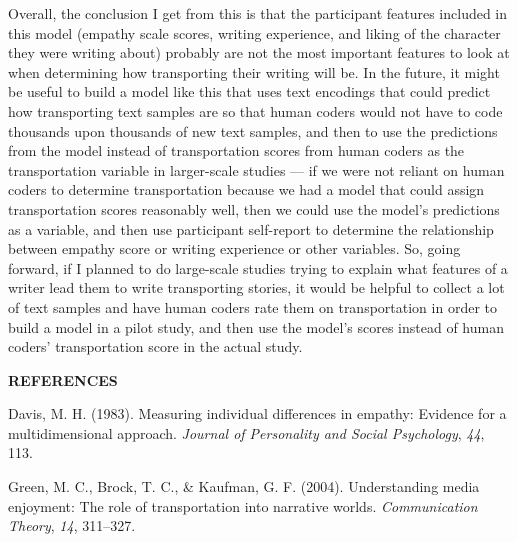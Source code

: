 \documentclass[
  man,floatsintext]{apa6}
\newlength{\cslhangindent}
\newlength{\cslentryspacingunit} %
\newenvironment{CSLReferences}[2] %
 {%
  \setlength{\parindent}{0pt}
  \ifodd #1
  \let\oldpar\par
  \def\par{\hangindent=\cslhangindent\oldpar}
  \fi
  \setlength{\parskip}{#2\cslentryspacingunit}
 }%
 {}
\begin{document}
Overall, the conclusion I get from this is that the participant features included in this model (empathy scale scores, writing experience, and liking of the character they were writing about) probably are not the most important features to look at when determining how transporting their writing will be. In the future, it might be useful to build a model like this that uses text encodings that could predict how transporting text samples are so that human coders would not have to code thousands upon thousands of new text samples, and then to use the predictions from the model instead of transportation scores from human coders as the transportation variable in larger-scale studies --- if we were not reliant on human coders to determine transportation because we had a model that could assign transportation scores reasonably well, then we could use the model's predictions as a variable, and then use participant self-report to determine the relationship between empathy score or writing experience or other variables. So, going forward, if I planned to do large-scale studies trying to explain what features of a writer lead them to write transporting stories, it would be helpful to collect a lot of text samples and have human coders rate them on transportation in order to build a model in a pilot study, and then use the model's scores instead of human coders' transportation score in the actual study.

\newpage

\textbf{REFERENCES}

\hypertarget{refs}{}
\begin{CSLReferences}{1}{0}
\leavevmode{}%
Davis, M. H. (1983). Measuring individual differences in empathy: Evidence for a multidimensional approach. \emph{Journal of Personality and Social Psychology}, \emph{44}, 113.

\leavevmode{}%
Green, M. C., Brock, T. C., \& Kaufman, G. F. (2004). Understanding media enjoyment: The role of transportation into narrative worlds. \emph{Communication Theory}, \emph{14}, 311--327.

\end{CSLReferences}
\end{document}
